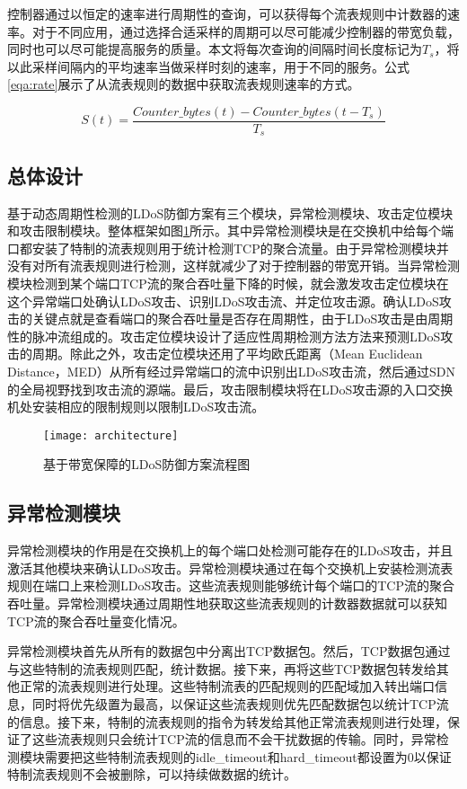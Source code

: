 控制器通过以恒定的速率进行周期性的查询，可以获得每个流表规则中计数器的速率。对于不同应用，通过选择合适采样的周期可以尽可能减少控制器的带宽负载，同时也可以尽可能提高服务的质量。本文将每次查询的间隔时间长度标记为$T_s$，将以此采样间隔内的平均速率当做采样时刻的速率，用于不同的服务。公式\ref{eqa:rate}展示了从流表规则的数据中获取流表规则速率的方式。

\begin{equation}
	\label{eqa:rate}
	S(t) = \frac{Counter\_bytes(t) - Counter\_bytes(t - T_s)}{T_s}
\end{equation}

\subsection{总体设计}
\label{chap4:overview}

基于动态周期性检测的LDoS防御方案有三个模块，异常检测模块、攻击定位模块和攻击限制模块。整体框架如图\ref{fig:architecture}所示。其中异常检测模块是在交换机中给每个端口都安装了特制的流表规则用于统计检测TCP的聚合流量。由于异常检测模块并没有对所有流表规则进行检测，这样就减少了对于控制器的带宽开销。当异常检测模块检测到某个端口TCP流的聚合吞吐量下降的时候，就会激发攻击定位模块在这个异常端口处确认LDoS攻击、识别LDoS攻击流、并定位攻击源。确认LDoS攻击的关键点就是查看端口的聚合吞吐量是否存在周期性，由于LDoS攻击是由周期性的脉冲流组成的。攻击定位模块设计了适应性周期检测方法方法来预测LDoS攻击的周期。除此之外，攻击定位模块还用了平均欧氏距离（Mean Euclidean Distance，MED）从所有经过异常端口的流中识别出LDoS攻击流，然后通过SDN的全局视野找到攻击流的源端。最后，攻击限制模块将在LDoS攻击源的入口交换机处安装相应的限制规则以限制LDoS攻击流。

\begin{figure}
    \centering
    \texttt{[image: architecture]}
    \caption{基于带宽保障的LDoS防御方案流程图}
    \label{fig:architecture}
\end{figure}

\subsection{异常检测模块}
\label{chap4:Monitor}
异常检测模块的作用是在交换机上的每个端口处检测可能存在的LDoS攻击，并且激活其他模块来确认LDoS攻击。异常检测模块通过在每个交换机上安装检测流表规则在端口上来检测LDoS攻击。这些流表规则能够统计每个端口的TCP流的聚合吞吐量。异常检测模块通过周期性地获取这些流表规则的计数器数据就可以获知TCP流的聚合吞吐量变化情况。

异常检测模块首先从所有的数据包中分离出TCP数据包。然后，TCP数据包通过与这些特制的流表规则匹配，统计数据。接下来，再将这些TCP数据包转发给其他正常的流表规则进行处理。这些特制流表的匹配规则的匹配域加入转出端口信息，同时将优先级置为最高，以保证这些流表规则优先匹配数据包以统计TCP流的信息。接下来，特制的流表规则的指令为转发给其他正常流表规则进行处理，保证了这些流表规则只会统计TCP流的信息而不会干扰数据的传输。同时，异常检测模块需要把这些特制流表规则的idle\_timeout和hard\_timeout都设置为0以保证特制流表规则不会被删除，可以持续做数据的统计。

